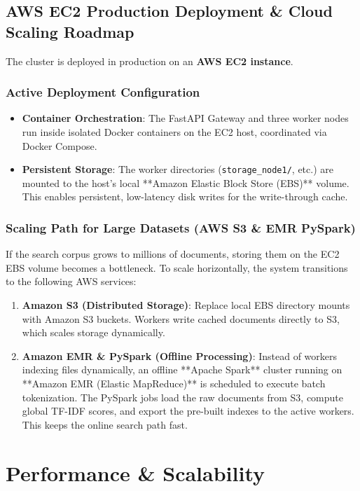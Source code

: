 \documentclass[11pt,a4paper]{article}
\begin{document}
\subsection{AWS EC2 Production Deployment \& Cloud Scaling Roadmap}
The cluster is deployed in production on an \textbf{AWS EC2 instance}.

\subsubsection{Active Deployment Configuration}
\begin{itemize}
    \item \textbf{Container Orchestration}: The FastAPI Gateway and three worker nodes run inside isolated Docker containers on the EC2 host, coordinated via Docker Compose.
    \item \textbf{Persistent Storage}: The worker directories (\texttt{storage\_node1/}, etc.) are mounted to the host's local **Amazon Elastic Block Store (EBS)** volume. This enables persistent, low-latency disk writes for the write-through cache.
\end{itemize}

\subsubsection{Scaling Path for Large Datasets (AWS S3 \& EMR PySpark)}
If the search corpus grows to millions of documents, storing them on the EC2 EBS volume becomes a bottleneck. To scale horizontally, the system transitions to the following AWS services:
\begin{enumerate}
    \item \textbf{Amazon S3 (Distributed Storage)}: Replace local EBS directory mounts with Amazon S3 buckets. Workers write cached documents directly to S3, which scales storage dynamically.
    \item \textbf{Amazon EMR \& PySpark (Offline Processing)}: Instead of workers indexing files dynamically, an offline **Apache Spark** cluster running on **Amazon EMR (Elastic MapReduce)** is scheduled to execute batch tokenization. The PySpark jobs load the raw documents from S3, compute global TF-IDF scores, and export the pre-built indexes to the active workers. This keeps the online search path fast.
\end{enumerate}

\newpage

\section{Performance \& Scalability}
\end{document}
